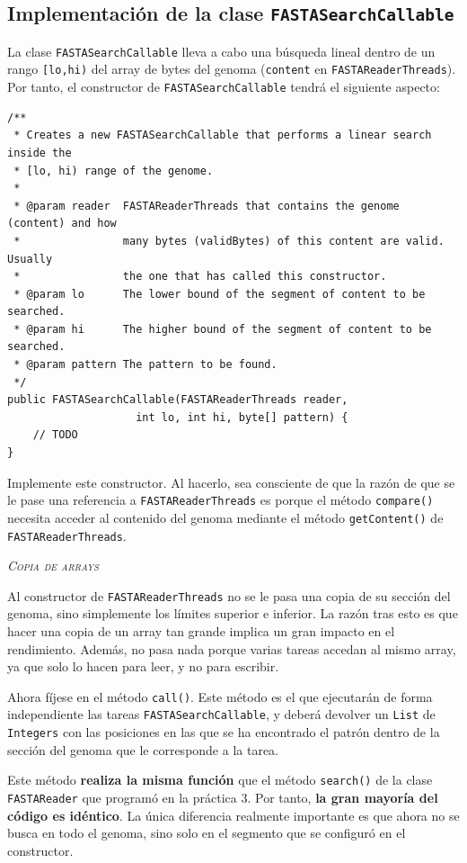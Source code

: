 \documentclass[10pt,a4paper,spanish]{article}
\newcommand{\sombreado}[2]{
  \begin{shaded}
    \begin{center} \emph{\textsc{#1}} \end{center}
    \noindent #2\\
  \end{shaded}
}
\newcommand{\code}[1]{\texttt{#1}}
\begin{document}
\subsection{Implementación de la clase \code{FASTASearchCallable}}

La clase \code{FASTASearchCallable} lleva a cabo una búsqueda lineal dentro de un rango \code{[lo,hi)} del array de bytes del genoma (\code{content} en \code{FASTAReaderThreads}). Por tanto, el constructor de \code{FASTASearchCallable} tendrá el siguiente aspecto:

\begin{verbatim}
/**
 * Creates a new FASTASearchCallable that performs a linear search inside the
 * [lo, hi) range of the genome.
 * 
 * @param reader  FASTAReaderThreads that contains the genome (content) and how
 *                many bytes (validBytes) of this content are valid. Usually
 *                the one that has called this constructor.
 * @param lo      The lower bound of the segment of content to be searched.
 * @param hi      The higher bound of the segment of content to be searched.
 * @param pattern The pattern to be found.
 */
public FASTASearchCallable(FASTAReaderThreads reader,
                    int lo, int hi, byte[] pattern) {
    // TODO
}
\end{verbatim}

Implemente este constructor. Al hacerlo, sea consciente de que la razón de que se le pase una referencia a \code{FASTAReaderThreads} es porque el método \code{compare()} necesita acceder al contenido del genoma mediante el método \code{getContent()} de \code{FASTAReaderThreads}.

\sombreado{Copia de arrays}{Al constructor de \code{FASTAReaderThreads} no se le pasa una copia de su sección del genoma, sino simplemente los límites superior e inferior. La razón tras esto es que hacer una copia de un array tan grande implica un gran impacto en el rendimiento. Además, no pasa nada porque varias tareas accedan al mismo array, ya que solo lo hacen para leer, y no para escribir.}

Ahora fíjese en el método \code{call()}. Este método es el que ejecutarán de forma independiente las tareas \code{FASTASearchCallable}, y deberá devolver un \code{List} de \code{Integers} con las posiciones en las que se ha encontrado el patrón dentro de la sección del genoma que le corresponde a la tarea.

Este método \textbf{realiza la misma función} que el método \code{search()} de la clase \code{FASTAReader} que programó en la práctica 3. Por tanto, \textbf{la gran mayoría del código es idéntico}. La única diferencia realmente importante es que ahora no se busca en todo el genoma, sino solo en el segmento que se configuró en el constructor.
\end{document}
